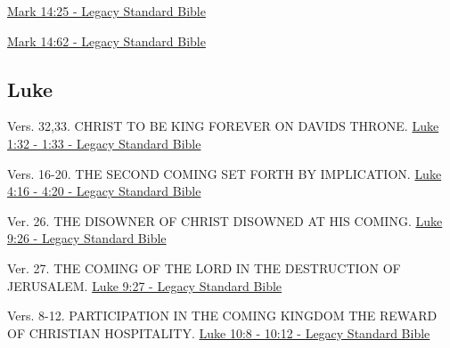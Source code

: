 \documentclass[
  ignorenonframetext,
]{beamer}
\begin{document}
\begin{frame}{14}
\label{section-165}
\href{https://read.lsbible.org/?q=mk14\%3A25}{Mark 14:25 - Legacy
Standard Bible}

\href{https://read.lsbible.org/?q=mk14\%3A62}{Mark 14:62 - Legacy
Standard Bible}
\end{frame}

\subsection{Luke}\label{luke}

\begin{frame}{1}
\label{section-166}
\begin{block}{Vers. 32,33. CHRIST TO BE KING FOREVER ON
DAVID\textquotesingle S THRONE.}
\label{vers.-3233.-christ-to-be-king-forever-on-davids-throne.}
\href{https://read.lsbible.org/?q=lk1\%3A32-33}{Luke 1:32 - 1:33 -
Legacy Standard Bible}
\end{block}
\end{frame}

\begin{frame}{4}
\label{section-167}
\begin{block}{Vers. 16-20. THE SECOND COMING SET FORTH BY IMPLICATION.}
\label{vers.-16-20.-the-second-coming-set-forth-by-implication.}
\href{https://read.lsbible.org/?q=lk4\%3A16-20}{Luke 4:16 - 4:20 -
Legacy Standard Bible}
\end{block}
\end{frame}

\begin{frame}{9}
\label{section-168}
\begin{block}{Ver. 26. THE DISOWNER OF CHRIST DISOWNED AT HIS COMING.}
\label{ver.-26.-the-disowner-of-christ-disowned-at-his-coming.}
\href{https://read.lsbible.org/?q=lk9\%3A26}{Luke 9:26 - Legacy Standard
Bible}
\end{block}

\begin{block}{Ver. 27. THE COMING OF THE LORD IN THE DESTRUCTION OF
JERUSALEM.}
\label{ver.-27.-the-coming-of-the-lord-in-the-destruction-of-jerusalem.}
\href{https://read.lsbible.org/?q=lk9\%3A27}{Luke 9:27 - Legacy Standard
Bible}
\end{block}
\end{frame}

\begin{frame}{10}
\label{section-169}
\begin{block}{Vers. 8-12. PARTICIPATION IN THE COMING KINGDOM THE REWARD
OF CHRISTIAN HOSPITALITY.}
\label{vers.-8-12.-participation-in-the-coming-kingdom-the-reward-of-christian-hospitality.}
\href{https://read.lsbible.org/?q=lk10\%3A8-12}{Luke 10:8 - 10:12 -
Legacy Standard Bible}
\end{block}
\end{frame}
\end{document}
